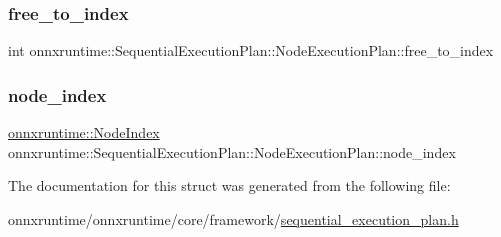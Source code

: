 \subsubsection{\texorpdfstring{free\+\_\+to\+\_\+index}{free\_to\_index}}
{\footnotesize\ttfamily int onnxruntime\+::\+Sequential\+Execution\+Plan\+::\+Node\+Execution\+Plan\+::free\+\_\+to\+\_\+index}

\mbox{\label{structonnxruntime_1_1SequentialExecutionPlan_1_1NodeExecutionPlan_a740ed6ec6f5a78135fd4f07661e19420}} 
\subsubsection{\texorpdfstring{node\+\_\+index}{node\_index}}
{\footnotesize\ttfamily \mbox{\hyperlink{namespaceonnxruntime_af8773b5c12b5d8fd9292eb2e268df760}{onnxruntime\+::\+Node\+Index}} onnxruntime\+::\+Sequential\+Execution\+Plan\+::\+Node\+Execution\+Plan\+::node\+\_\+index}



The documentation for this struct was generated from the following file\+:\begin{DoxyCompactItemize}
\item 
onnxruntime/onnxruntime/core/framework/\mbox{\hyperlink{sequential__execution__plan_8h}{sequential\+\_\+execution\+\_\+plan.\+h}}\end{DoxyCompactItemize}
